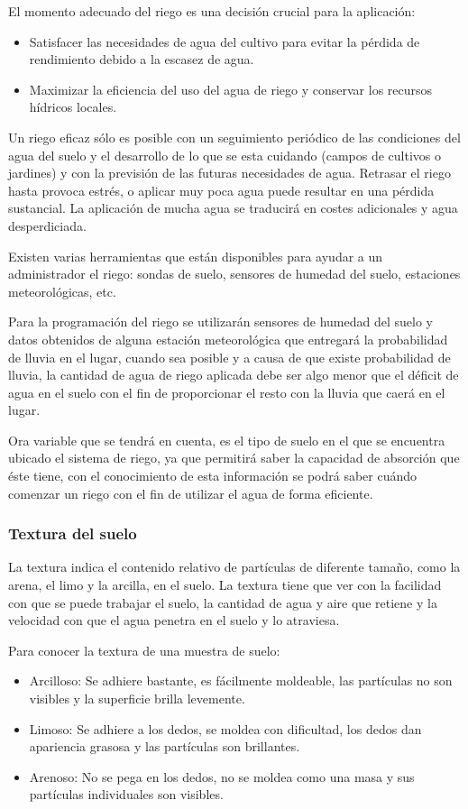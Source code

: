 \documentclass[11pt,letterpaper]{article}
\begin{document}
El momento adecuado del riego es una decisión crucial para la aplicación: 
\begin{itemize}
\item Satisfacer las necesidades de agua del cultivo para evitar la pérdida de rendimiento debido a la escasez de agua.
\item Maximizar la eficiencia del uso del agua de riego y conservar los recursos hídricos locales.
\end{itemize}

Un riego eficaz sólo es posible con un seguimiento periódico de las condiciones del agua del suelo y el desarrollo de lo que se esta cuidando (campos de cultivos o jardines) y con la previsión de las futuras necesidades de agua. Retrasar el riego hasta provoca estrés, o aplicar muy poca agua puede resultar en una pérdida sustancial. La aplicación de mucha agua se traducirá en costes adicionales y agua desperdiciada.

Existen varias herramientas que están disponibles para ayudar a un administrador el riego: sondas de suelo, sensores de humedad del suelo, estaciones meteorológicas, etc.

Para la programación del riego se utilizarán sensores de humedad del suelo y datos obtenidos de alguna estación meteorológica que entregará la probabilidad de lluvia en el lugar, cuando sea posible y a causa de que existe probabilidad de lluvia, la cantidad de agua de riego aplicada debe ser algo menor que el déficit de agua en el suelo con el fin de proporcionar el resto con la lluvia que caerá en el lugar.

Ora variable que se tendrá en cuenta, es el tipo de suelo en el que se encuentra ubicado el sistema de riego, ya que permitirá saber la capacidad de absorción  que éste tiene, con el conocimiento de esta información se podrá saber cuándo comenzar un riego con el fin de utilizar el agua de forma eficiente.


\subsubsection{Textura del suelo}

La textura indica el contenido relativo de partículas de diferente tamaño, como la arena, el limo y la arcilla, en el suelo. La textura tiene que ver con la facilidad con que se puede trabajar el suelo, la cantidad de agua y aire que retiene y la velocidad con que el agua penetra en el suelo y lo atraviesa.

Para conocer la textura de una muestra de suelo\citep{sueloTextura}:
\begin{itemize}
\item Arcilloso: Se adhiere bastante, es fácilmente moldeable, las partículas no son visibles y la superficie brilla levemente.
\item Limoso: Se adhiere a los dedos, se moldea con dificultad, los dedos dan apariencia grasosa y las partículas son brillantes.
\item Arenoso: No se pega en los dedos, no se moldea como una masa y sus partículas individuales son visibles.
\end{itemize}
\end{document}

